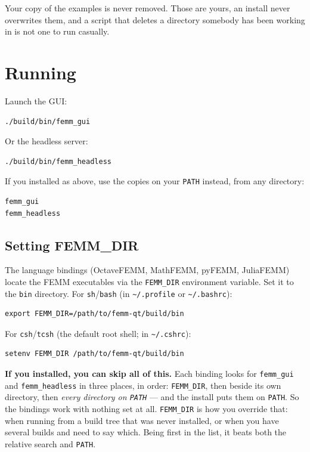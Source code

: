 \documentclass[11pt]{article}
\begin{document}
Your copy of the examples is never removed.  Those are yours, an install
never overwrites them, and a script that deletes a directory somebody has
been working in is not one to run casually.

\section{Running}

Launch the GUI:
\begin{lstlisting}
./build/bin/femm_gui
\end{lstlisting}

Or the headless server:
\begin{lstlisting}
./build/bin/femm_headless
\end{lstlisting}


If you installed as above, use the copies on your \texttt{PATH} instead,
from any directory:
\begin{lstlisting}
femm_gui
femm_headless
\end{lstlisting}

\subsection{Setting FEMM\_DIR}

The language bindings (OctaveFEMM, MathFEMM, pyFEMM, JuliaFEMM) locate the
FEMM executables via the \texttt{FEMM\_DIR} environment variable.  Set it to
the \texttt{bin} directory.  For \texttt{sh}/\texttt{bash} (in
\texttt{\textasciitilde/.profile} or \texttt{\textasciitilde/.bashrc}):
\begin{lstlisting}
export FEMM_DIR=/path/to/femm-qt/build/bin
\end{lstlisting}
For \texttt{csh}/\texttt{tcsh} (the default root shell; in
\texttt{\textasciitilde/.cshrc}):
\begin{lstlisting}
setenv FEMM_DIR /path/to/femm-qt/build/bin
\end{lstlisting}
\textbf{If you installed, you can skip all of this.}  Each binding looks
for \texttt{femm\_gui} and \texttt{femm\_headless} in three places, in
order: \texttt{FEMM\_DIR}, then beside its own directory, then \emph{every
directory on \texttt{PATH}} --- and the install puts them on
\texttt{PATH}.  So the bindings work with nothing set at all.
\texttt{FEMM\_DIR} is how you override that: when running from a build
tree that was never installed, or when you have several builds and need to
say which.  Being first in the list, it beats both the relative search and
\texttt{PATH}.
\end{document}
